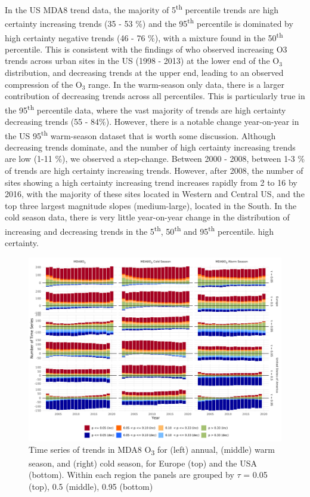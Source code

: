 \documentclass[journal abbreviation, manuscript]{copernicus}
\begin{document}
In the US MDA8 trend data, the majority of 5\textsuperscript{th} percentile trends are high certainty increasing trends (35 - 53 \%) and the 95\textsuperscript{th} percentile is dominated by high certainty negative trends (46 - 76 \%), with a mixture found in the 50\textsuperscript{th} percentile. This is consistent with the findings of \cite{Simon_2015} who observed increasing O3 trends across urban sites in the US (1998 - 2013) at the lower end of the O$_3$ distribution, and decreasing trends at the upper end, leading to an observed compression of the O$_3$ range. In the warm-season only data, there is a larger contribution of decreasing trends across all percentiles. This is particularly true in the 95\textsuperscript{th} percentile data, where the vast majority of trends are high certainty decreasing trends (55 - 84\%). However, there is a notable change year-on-year in the US 95\textsuperscript{th} warm-season dataset that is worth some discussion. Although decreasing trends dominate, and the number of high certainty increasing trends are low (1-11 \%), we observed a step-change. Between 2000 - 2008, between 1-3 \% of trends are high certainty increasing trends. However, after 2008, the number of sites showing a high certainty increasing trend increases rapidly from 2 to 16 by 2016, with the majority of these sites located in Western and Central US, and the top three largest magnitude slopes (medium-large), located in the South. In the cold season data, there is very little year-on-year change in the distribution of increasing and decreasing trends in the 5\textsuperscript{th}, 50\textsuperscript{th} and 95\textsuperscript{th} percentile. high certainty.

\begin{figure}[h!]
\centering
\includegraphics[width=\textwidth]{figures/paper_figures/signifcance_bars.pdf}
\caption{Time series of trends in MDA8 O\textsubscript{3} for (left) annual, (middle) warm season, and (right) cold season, for Europe (top) and the USA (bottom). Within each region the panels are grouped by $\tau$ = 0.05 (top), 0.5 (middle), 0.95 (bottom)}
\label{fig:p_bar_year_mda8_anom_combined}
\end{figure}
\end{document}
